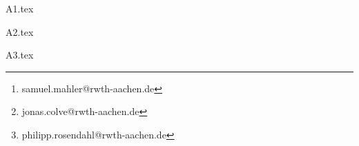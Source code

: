 \documentclass[12pt,a4paper]{scrartcl}
\author{Samuel Mahler, Mat.-Nr: 377993\thanks{samuel.mahler@rwth-aachen.de}\ ,
		\and Jonas Colve, Mat.Nr: 377593\thanks{jonas.colve@rwth-aachen.de}\ ,
		\and Philipp Rosendahl, Mat.Nr: 378092\thanks{philipp.rosendahl@rwth-aachen.de}}
\begin{document}
\parindent0cm

\maketitle

\newpage

\psection

{A1.tex}

\psection

{A2.tex}

\psection

{A3.tex}




\end{document}
